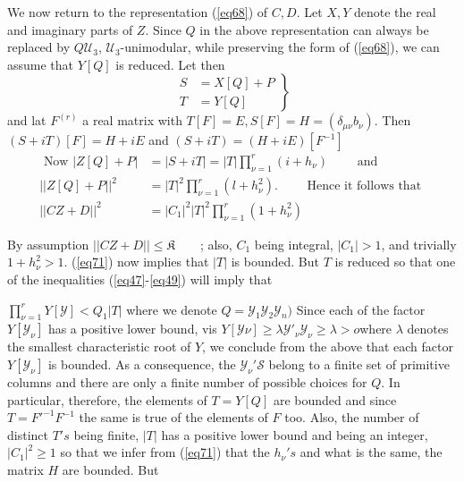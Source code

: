 We now return to the representation (\ref{eq68}) of $C, D$. Let $X, Y$
denote the real and imaginary parts of $Z$. Since $Q$ in the above
representation can always be replaced by $Q \mathcal{U}_3$,
$\mathcal{U}_3$-unimodular, while preserving the form of (\ref{eq68}), we
can assume that $Y[Q]$ is reduced. Let then 
\begin{equation*}
\left.
\tag{70}\label{eq70} 
\begin{aligned}
S & = X[Q]+P\\
T & = Y[Q]
\end{aligned}
\right \}
\end{equation*}
and lat $F^{(r)}$ a real matrix with $T[F] = E, S[F]=H=(\delta_{\mu
  \nu}b_\nu)$. Then  $(S+iT) [F]=H+iE$ and $(S+iT)=(H+iE)[F^{-1}]$  
\begin{align*}
\text{ Now }|Z[Q]+P| & =|S+iT| = |T| \prod \limits ^{r}_{\nu=1}
(i+h_\nu)  \qquad \text{ and }\\ 
||Z[Q]+P||^2 & =|T|^2 \prod \limits^{r}_{\nu =1}(l+h^2_\nu). \qquad
\text{ Hence it follows that }\\ 
||  CZ +D ||^2 & =|C_1|^2 |T|^2 \prod \limits ^{r}_{\nu =1}(1+h^2_\nu)
\tag{71}\label{eq71}  
\end{align*}

By assumption $|| CZ +D||\leq \mathfrak{K}\qquad $; also, $C_1$ being
integral, $|C_1| >1$, and trivially $1+h^2_\nu > 1$. (\ref{eq71}) now
implies that $|T|$ is bounded. But $ T$ is reduced so that one of the
inequalities (\ref{eq47}-\ref{eq49}) will imply that 

$\prod\limits^{r}_{\nu =1}Y[\mathscr{Y}] < Q_1 | T | $ where we
denote $Q = \mathscr{Y}_1 \mathscr{Y}_2 \mathscr{Y}_n)$ 
Since each of the factor $Y [\mathscr{Y}_\nu]$ has a positive lower
bound, vis $Y[\mathscr{Y}\nu] \geq \lambda \mathscr{Y}'_\nu
\mathscr{Y}_\nu \geq \lambda > o$\pageoriginale where $\lambda $ denotes the
smallest characteristic root of $Y$, we conclude from the above that
each factor $Y[\mathscr{Y}_\nu]$  is bounded. As a consequence, the
$\mathscr{Y}_\nu'\mathscr{S}$ belong to a finite set of primitive
columns and there are only a finite number of possible choices for
$Q$. In particular, therefore, the elements of $T=Y[Q]$ are
bounded and since $T=F'^{-1}F^{-1}$ the same is true of the elements of
$F$ too. Also, the number of distinct $T's$ being finite, $|T|$ has a
positive lower bound and being an integer, $|C_1|^2 \geq 1$ so that we
infer from (\ref{eq71}) that the $h_\nu's$ and what is the same,
the matrix $H$ are bounded. But 


